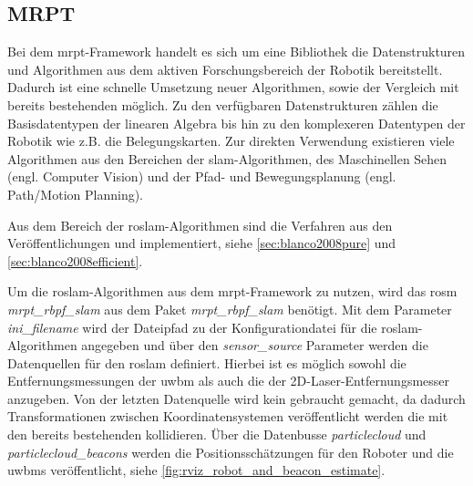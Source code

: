 \begin{comment}
--------------------------------------------------------------------------------
- \url{https://www.mrpt.org}
- \url{http://wiki.ros.org/mrpt_slam}
- \url{http://wiki.ros.org/mrpt_navigation}
- \url{https://www.mrpt.org/tutorials/slam-algorithms/rangeonly_slam/}
	- Bayesian range-only SLAM (RO-SLAM) with SOGs
- \url{http://mrpt.ual.es/reference/devel/classmrpt_1_1slam_1_1_c_metric_map_builder_r_b_p_f.html}
	-mrpt::slam::CMetricMapBuilderRBPF Class Reference
	- It is actually a front-end to the class mrpt::slam::CMetricMapBuilderRBPF. All the parameters to the algorithm are passed through a configuration file in the command line. The filter processes actions and observations from a rawlog file and optionally generates a number of files describing the evolution of the filter and the maps.
\end{comment}
\subsection{MRPT}

Bei dem \Gls{mrpt}-Framework handelt es sich um eine Bibliothek die Datenstrukturen und Algorithmen aus dem aktiven Forschungsbereich der Robotik bereitstellt. Dadurch ist eine schnelle Umsetzung neuer Algorithmen, sowie der Vergleich mit bereits bestehenden möglich. Zu den verfügbaren Datenstrukturen zählen die Basisdatentypen der linearen Algebra bis hin zu den komplexeren Datentypen der Robotik wie z.B. die Belegungskarten. Zur direkten Verwendung existieren viele Algorithmen aus den Bereichen der \Gls{slam}-Algorithmen, des Maschinellen Sehen (engl. Computer Vision) und der Pfad- und Bewegungsplanung (engl. Path/Motion Planning).

Aus dem Bereich der \Gls{roslam}-Algorithmen sind die Verfahren aus den Veröffentlichungen  und  implementiert, siehe \autoref{sec:blanco2008pure} und \ref{sec:blanco2008efficient}.

Um die \Gls{roslam}-Algorithmen aus dem \Gls{mrpt}-Framework zu nutzen, wird das \Gls{rosm} \textit{mrpt\_rbpf\_slam} aus dem Paket \textit{mrpt\_rbpf\_slam} benötigt. Mit dem Parameter \textit{ini\_filename} wird der Dateipfad zu der Konfigurationdatei für die \Gls{roslam}-Algorithmen angegeben und über den \textit{sensor\_source} Parameter werden die Datenquellen für den \Gls{roslam} definiert. Hierbei ist es möglich sowohl die Entfernungsmessungen der \Gls{uwbm} als auch die der 2D-Laser-Entfernungsmesser anzugeben. Von der letzten Datenquelle wird kein gebraucht gemacht, da dadurch Transformationen zwischen Koordinatensystemen veröffentlicht werden die mit den bereits bestehenden kollidieren. Über die Datenbusse \textit{particlecloud} und \textit{particlecloud\_beacons} werden die Positionsschätzungen für den Roboter und die \Glspl{uwbm} veröffentlicht, siehe \autoref{fig:rviz_robot_and_beacon_estimate}.

